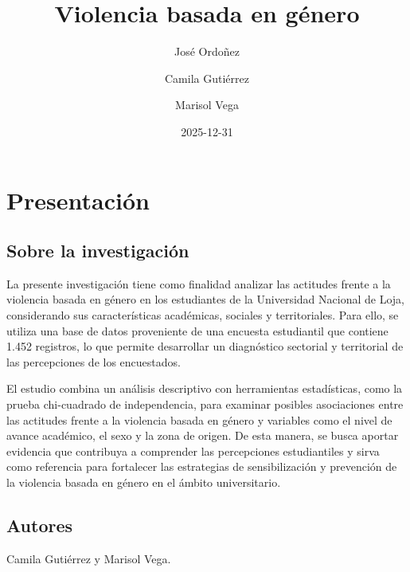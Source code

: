 \documentclass[
  spanish,
  11pt,
  letterpaper,
  DIV=11,
  numbers=noendperiod]{scrreprt}
\title{Violencia basada en género}
\author{José Ordoñez \and Camila Gutiérrez \and Marisol Vega}
\date{2025-12-31}
\renewcommand*\contentsname{Tabla de contenidos}
\newcommand\contentsname{Tabla de contenidos}
\begin{document}
\maketitle

\renewcommand*\contentsname{Tabla de contenidos}
{
\setcounter{tocdepth}{2}
\tableofcontents
}


\chapter{Presentación}\label{presentaciuxf3n}

\section*{Sobre la investigación}\label{sobre-la-investigaciuxf3n}


La presente investigación tiene como finalidad analizar las actitudes
frente a la violencia basada en género en los estudiantes de la
Universidad Nacional de Loja, considerando sus características
académicas, sociales y territoriales. Para ello, se utiliza una base de
datos proveniente de una encuesta estudiantil que contiene 1.452
registros, lo que permite desarrollar un diagnóstico sectorial y
territorial de las percepciones de los encuestados.

El estudio combina un análisis descriptivo con herramientas
estadísticas, como la prueba chi-cuadrado de independencia, para
examinar posibles asociaciones entre las actitudes frente a la violencia
basada en género y variables como el nivel de avance académico, el sexo
y la zona de origen. De esta manera, se busca aportar evidencia que
contribuya a comprender las percepciones estudiantiles y sirva como
referencia para fortalecer las estrategias de sensibilización y
prevención de la violencia basada en género en el ámbito universitario.

\section*{Autores}\label{autores}


Camila Gutiérrez y Marisol Vega.

\end{document}
